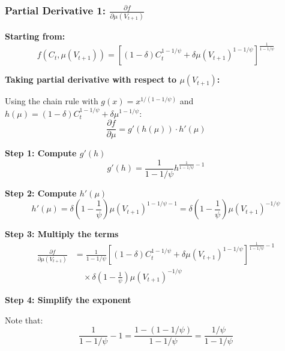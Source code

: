 \documentclass{beamer}
\begin{document}
\begin{frame}[allowframebreaks]
    \frametitle{Partial Derivative 1: $\frac{\partial f}{\partial \mu(V_{t+1})}$}
    
    \textbf{Starting from:}
    \begin{equation*}
        f(C_t, \mu(V_{t+1})) = \left[ (1-\delta)C_t^{1-1/\psi} + \delta\mu(V_{t+1})^{1-1/\psi} \right]^{\frac{1}{1-1/\psi}}
    \end{equation*}
    
    \textbf{Taking partial derivative with respect to $\mu(V_{t+1})$:}
    
    Using the chain rule with $g(x) = x^{1/(1-1/\psi)}$ and $h(\mu) = (1-\delta)C_t^{1-1/\psi} + \delta\mu^{1-1/\psi}$:
    \begin{equation*}
        \frac{\partial f}{\partial \mu} = g'(h(\mu)) \cdot h'(\mu)
    \end{equation*}
    
    \framebreak
    
    \textbf{Step 1: Compute $g'(h)$}
    \begin{equation*}
        g'(h) = \frac{1}{1-1/\psi} h^{\frac{1}{1-1/\psi}-1}
    \end{equation*}
    
    \textbf{Step 2: Compute $h'(\mu)$}
    \begin{equation*}
        h'(\mu) = \delta \left(1 - \frac{1}{\psi}\right) \mu(V_{t+1})^{1-1/\psi-1} = \delta \left(1 - \frac{1}{\psi}\right) \mu(V_{t+1})^{-1/\psi}
    \end{equation*}
    
    \framebreak
    
    \textbf{Step 3: Multiply the terms}
    \begin{equation*}
        \begin{aligned}
            \frac{\partial f}{\partial \mu(V_{t+1})} &= \frac{1}{1-1/\psi} \left[ (1-\delta)C_t^{1-1/\psi} + \delta\mu(V_{t+1})^{1-1/\psi} \right]^{\frac{1}{1-1/\psi}-1} \\
            &\quad \times \delta \left(1 - \frac{1}{\psi}\right) \mu(V_{t+1})^{-1/\psi}
        \end{aligned}
    \end{equation*}
    
    \framebreak
    
    \textbf{Step 4: Simplify the exponent}
    
    Note that:
    \begin{equation*}
        \frac{1}{1-1/\psi} - 1 = \frac{1 - (1-1/\psi)}{1-1/\psi} = \frac{1/\psi}{1-1/\psi}
    \end{equation*}
    

\end{frame}
\end{document}
